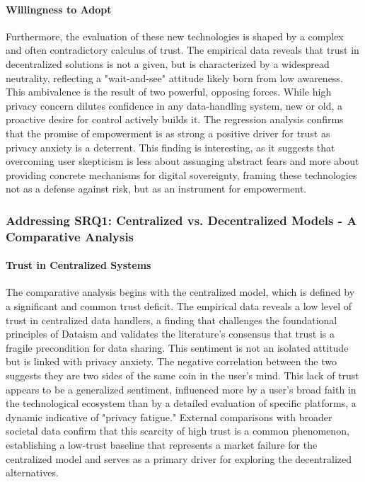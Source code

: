 	\paragraph{Willingness to Adopt}
	Furthermore, the evaluation of these new technologies is shaped by a complex and often contradictory calculus of trust. The empirical data reveals that trust in decentralized solutions is not a given, but is characterized by a widespread neutrality, reflecting a "wait-and-see" attitude likely born from low awareness. This ambivalence is the result of two powerful, opposing forces. While high privacy concern dilutes confidence in any data-handling system, new or old, a proactive desire for control actively builds it. The regression analysis confirms that the promise of empowerment is as strong a positive driver for trust as privacy anxiety is a deterrent. This finding is interesting, as it suggests that overcoming user skepticism is less about assuaging abstract fears and more about providing concrete mechanisms for digital sovereignty, framing these technologies not as a defense against risk, but as an instrument for empowerment.
	\subsubsection{Addressing SRQ1: Centralized vs. Decentralized Models - A Comparative Analysis}

	\paragraph{Trust in Centralized Systems}
	The comparative analysis begins with the centralized model, which is defined by a significant and common trust deficit. The empirical data reveals a low level of trust in centralized data handlers, a finding that challenges the foundational principles of Dataism and validates the literature's consensus that trust is a fragile precondition for data sharing. This sentiment is not an isolated attitude but is linked with privacy anxiety. The negative correlation between the two suggests they are two sides of the same coin in the user's mind. This lack of trust appears to be a generalized sentiment, influenced more by a user's broad faith in the technological ecosystem than by a detailed evaluation of specific platforms, a dynamic indicative of "privacy fatigue." External comparisons with broader societal data confirm that this scarcity of high trust is a common phenomenon, establishing a low-trust baseline that represents a market failure for the centralized model and serves as a primary driver for exploring the decentralized alternatives.

